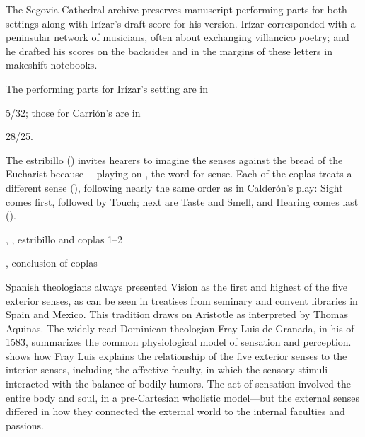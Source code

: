 The Segovia Cathedral archive preserves manuscript performing parts for both settings along with Irízar's draft score for his version.
Irízar corresponded with a peninsular network of musicians, often about exchanging villancico poetry; and he drafted his scores on the backsides and in the margins of these letters in makeshift notebooks.
\begin{Footnote}
  The performing parts for Irízar's setting are in \signature{E-SE}{5/32}; those for Carrión's are in \signature{E-SE}{28/25}.
\end{Footnote}

The estribillo () invites hearers to imagine the senses  against the bread of the Eucharist because ---playing on , the word for sense.
Each of the coplas treats a different sense (), following nearly the same order as in Calderón's play: 
Sight comes first, followed by Touch; next are Taste and Smell, and Hearing comes last ().

\begin{expoem}
  \caption{, , estribillo and coplas 1--2}
  \label{expoem:Si_los_sentidos-Sanchez-estribillo}
\end{expoem}
\begin{expoem}
  \caption{, conclusion of coplas}
  \label{expoem:Si_los_sentidos-Sanchez-coplas}
\end{expoem}


Spanish theologians always presented Vision as the first and highest of the five exterior senses, as can be seen in treatises from seminary and convent libraries in Spain and Mexico.
This tradition draws on Aristotle as interpreted by Thomas Aquinas.
The widely read Dominican theologian Fray Luis de Granada, in his  of 1583, summarizes the common physiological model of sensation and perception.
 shows how Fray Luis explains the relationship of the five exterior senses to the interior senses, including the affective faculty, in which the sensory stimuli interacted with the balance of bodily humors.
The act of sensation involved the entire body and soul, in a pre-Cartesian wholistic model---but the external senses differed in how they connected the external world to the internal faculties and passions.

